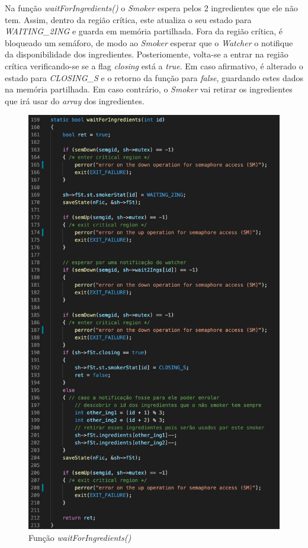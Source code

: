 \documentclass[10pt,portuguese]{article}
\begin{document}
\par Na função \textit{waitForIngredients()} o \textit{Smoker} espera pelos 2 ingredientes que ele não tem. Assim, dentro da região crítica, este atualiza o seu estado para \textit{WAITING\_2ING} e guarda em memória partilhada. Fora da região crítica, é bloqueado um semáforo, de modo ao \textit{Smoker} esperar que o \textit{Watcher} o notifique da disponibilidade dos ingredientes. Posteriomente, volta-se a entrar na região crítica verificando-se se a flag \textit{closing} está a \textit{true}. Em caso afirmativo, é alterado o estado para \textit{CLOSING\_S} e o retorno da função para \textit{false}, guardando estes dados na memória partilhada. Em caso contrário, o \textit{Smoker} vai retirar os ingredientes que irá usar do \textit{array} dos ingredientes.

\begin{figure}[!h]
    \centering
    \includegraphics[scale=0.7]{images/implementation/waitforings.png}
    \caption{Função \textit{waitForIngredients()}}
\end{figure}
\end{document}
